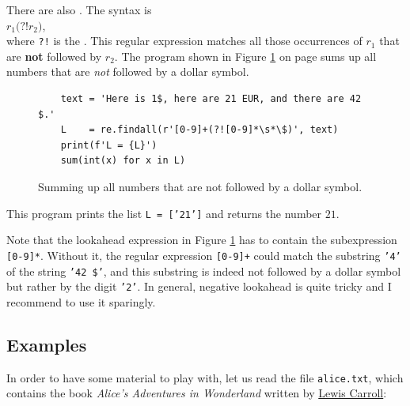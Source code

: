 There are also .  The syntax is
\\[0.2cm]
\hspace*{1.3cm}
$r_1\texttt{(?!}r_2\texttt{)}$,
\\[0.2cm]
where \texttt{?!} is the .  This regular expression matches all those
occurrences of $r_1$ that are \textbf{not} followed by $r_2$.  The program shown in Figure
\ref{fig:neg-lookahead.py} on page \pageref{fig:neg-lookahead.py} sums up all numbers that are \emph{not}
followed by a dollar symbol.

\begin{figure}[!ht]
\centering
  \begin{verbatim}
    text = 'Here is 1$, here are 21 EUR, and there are 42 $.'
    L    = re.findall(r'[0-9]+(?![0-9]*\s*\$)', text)
    print(f'L = {L}')
    sum(int(x) for x in L)
\end{verbatim}
\vspace*{-0.3cm}
\caption{Summing up all numbers that are not followed by a dollar symbol.}
\label{fig:neg-lookahead.py}
\end{figure}

\noindent
This program prints the list \texttt{L = ['21']} and returns the number $21$.

\remarkEng
Note that the lookahead expression in Figure \ref{fig:neg-lookahead.py} has to contain the subexpression
\texttt{[0-9]*}.  Without it, the regular expression \texttt{[0-9]+} could match the substring \texttt{'4'} of
the string \texttt{'42 \$'}, and this substring is indeed not followed by a dollar symbol but rather by the digit
\texttt{'2'}.  In general, negative lookahead is quite tricky and I recommend to use it sparingly.
\eox

\subsection{Examples}
In order to have some material to play with, let us read the file \texttt{alice.txt}, which contains the book
\emph{Alice's Adventures in Wonderland} written by
\href{https://en.wikipedia.org/wiki/Lewis_Carroll}{Lewis Carroll}:


